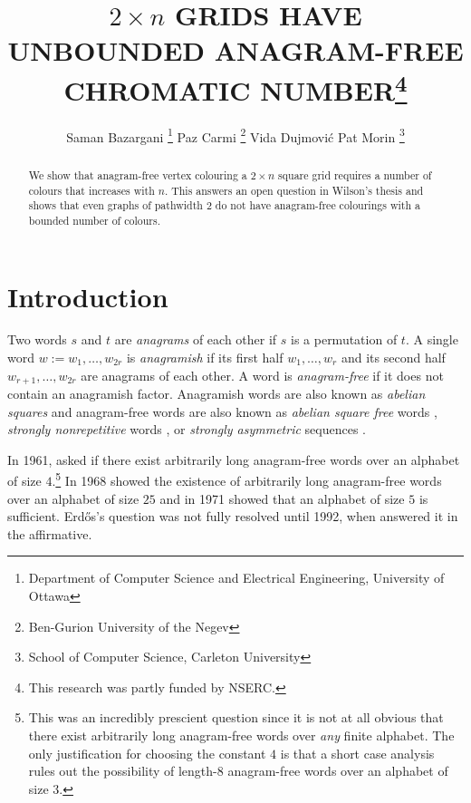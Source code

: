 \documentclass{patmorin}
\title{\MakeUppercase{$2\times n$ Grids have Unbounded Anagram-Free Chromatic Number}\thanks{This research was partly funded by NSERC.}}
\author{Saman Bazargani%
    \thanks{Department of Computer Science and Electrical Engineering, University of Ottawa}\qquad
    Paz Carmi%
    \thanks{Ben-Gurion University of the Negev}\qquad
    Vida Dujmović\footnotemark[2]\qquad
    Pat Morin%
    \thanks{School of Computer Science, Carleton University}}
\date{}
\begin{document}
\maketitle

\begin{abstract}
    We show that anagram-free vertex colouring a $2\times n$ square grid requires a number of colours that increases with $n$.  This answers an open question in Wilson's thesis and shows that even graphs of pathwidth $2$ do not have anagram-free colourings with a bounded number of colours.
\end{abstract}

%



\section{Introduction}

Two words $s$ and $t$ are \emph{anagrams} of each other if $s$ is a permutation of $t$.  A single word $w:=w_1,\ldots,w_{2r}$ is \emph{anagramish} if its first half $w_1,\ldots,w_r$ and its second half $w_{r+1},\ldots,w_{2r}$ are anagrams of each other.  A word is \emph{anagram-free} if it does not contain an anagramish factor.  Anagramish words are also known as \emph{abelian squares} and anagram-free words are also known as \emph{abelian square free} words \cite{keranen:abelian,keranen:powerful}, \emph{strongly nonrepetitive} words \cite{pleasants:non-repetitive}, or \emph{strongly asymmetric} sequences \cite{evdokimov:strongly,evdokimov:strongly2}.

In 1961, \citet{erdos:some} asked if there exist arbitrarily long anagram-free words over an alphabet of size $4$.\footnote{This was an incredibly prescient question since it is not at all obvious that there exist arbitrarily long anagram-free words over \emph{any} finite alphabet. The only justification for choosing the constant $4$ is that a short case analysis rules out the possibility of length-$8$ anagram-free words over an alphabet of size $3$.}  In 1968 \citet{evdokimov:strongly,evdokimov:strongly2} showed the existence of arbitrarily long anagram-free words over an alphabet of size $25$ and in 1971 \citet{pleasants:non-repetitive} showed that an alphabet of size $5$ is sufficient.  Erd\H{o}s's question was not fully resolved until 1992, when \citet{keranen:abelian} answered it in the affirmative.
\end{document}
